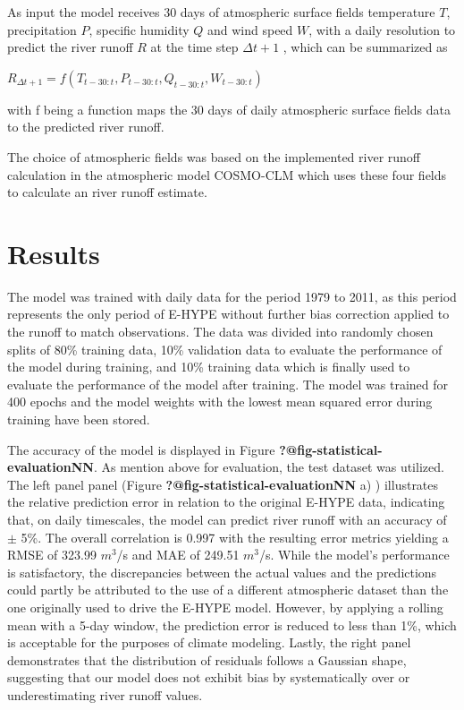 \documentclass[
]{agujournal2019}
\begin{document}
As input the model receives 30 days of atmospheric surface fields
temperature \(T\), precipitation \(P\), specific humidity \(Q\) and wind
speed \(W\), with a daily resolution to predict the river runoff \(R\)
at the time step \(\Delta t+1\) , which can be summarized as

\(R_{\Delta t+1} = f\left(T_{t-30:t}, P_{t-30:t}, Q_{t-30:t}, W_{t-30:t}\right)\)

with f being a function maps the 30 days of daily atmospheric surface
fields data to the predicted river runoff.

The choice of atmospheric fields was based on the implemented river
runoff calculation in the atmospheric model COSMO-CLM which uses these
four fields to calculate an river runoff estimate.

\section{Results}\label{results}

The model was trained with daily data for the period 1979 to 2011, as
this period represents the only period of E-HYPE without further bias
correction applied to the runoff to match observations. The data was
divided into randomly chosen splits of 80\% training data, 10\%
validation data to evaluate the performance of the model during
training, and 10\% training data which is finally used to evaluate the
performance of the model after training. The model was trained for 400
epochs and the model weights with the lowest mean squared error during
training have been stored.

The accuracy of the model is displayed in Figure
\textbf{?@fig-statistical-evaluationNN}. As mention above for
evaluation, the test dataset was utilized. The left panel panel (Figure
\textbf{?@fig-statistical-evaluationNN} a) ) illustrates the relative
prediction error in relation to the original E-HYPE data, indicating
that, on daily timescales, the model can predict river runoff with an
accuracy of \(\pm\) 5\%. The overall correlation is 0.997 with the
resulting error metrics yielding a RMSE of 323.99 \(m^3\)/s and MAE of
249.51 \(m^3\)/s. While the model's performance is satisfactory, the
discrepancies between the actual values and the predictions could partly
be attributed to the use of a different atmospheric dataset than the one
originally used to drive the E-HYPE model. However, by applying a
rolling mean with a 5-day window, the prediction error is reduced to
less than 1\%, which is acceptable for the purposes of climate modeling.
Lastly, the right panel demonstrates that the distribution of residuals
follows a Gaussian shape, suggesting that our model does not exhibit
bias by systematically over or underestimating river runoff values.
\end{document}
